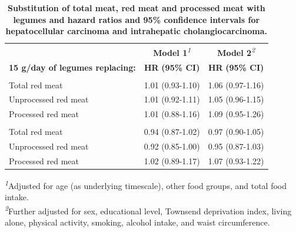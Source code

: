 \begin{table}[t]
\caption{{\small \textbf{Substitution of total meat, red meat and processed meat with legumes and hazard ratios and 95\% confidence intervals for hepatocellular carcinoma and intrahepatic cholangiocarcinoma.}}}\label{tab-cancer}
\begin{tabular*}{1\linewidth}{@{\extracolsep{\fill}}lcc}
\toprule
 & \textbf{Model 1}\textsuperscript{\textit{1}} & \textbf{Model 2}\textsuperscript{\textit{2}} \\
\cmidrule(lr){2-2} \cmidrule(lr){3-3}
\textbf{15 g/day of legumes replacing:} & \textbf{HR} \textbf{(95\% CI)} & \textbf{HR} \textbf{(95\% CI)} \\
\midrule\addlinespace[2.5pt]
\multicolumn{3}{l}{{\bfseries Hepatocellular carcinoma}} \\
\midrule\addlinespace[2.5pt]
Total red meat & 1.01 (0.93-1.10) & 1.06 (0.97-1.16) \\
Unprocessed red meat & 1.01 (0.92-1.11) & 1.05 (0.96-1.15) \\
Processed red meat & 1.01 (0.88-1.16) & 1.09 (0.95-1.26) \\
\midrule\addlinespace[2.5pt]
\multicolumn{3}{l}{{\bfseries Intrahepatic cholangiocarcinoma}} \\
\midrule\addlinespace[2.5pt]
Total red meat & 0.94 (0.87-1.02) & 0.97 (0.90-1.05) \\
Unprocessed red meat & 0.92 (0.85-1.00) & 0.95 (0.87-1.03) \\
Processed red meat & 1.02 (0.89-1.17) & 1.07 (0.93-1.22) \\
\bottomrule
\end{tabular*}
\begin{minipage}{\linewidth}
\textsuperscript{\textit{1}}Adjusted for age (as underlying timescale), other food groups, and total food intake.\\
\textsuperscript{\textit{2}}Further adjusted for sex, educational level, Townsend deprivation index, living alone, physical activity, smoking, alcohol intake, and waist circumference.\\
\end{minipage}
\end{table}

